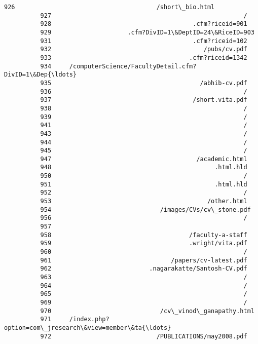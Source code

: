 \documentclass[11pt]{article}
\begin{document}
\begin{Verbatim}[commandchars=\\\{\}]
          926                                       /short\_bio.html
          927                                                     /
          928                                       .cfm?riceid=901
          929                     .cfm?DivID=1\&DeptID=24\&RiceID=903
          931                                       .cfm?riceid=102
          932                                          /pubs/cv.pdf
          933                                      .cfm?riceid=1342
          934     /computerScience/FacultyDetail.cfm?DivID=1\&Dep{\ldots}
          935                                         /abhib-cv.pdf
          936                                                     /
          937                                       /short.vita.pdf
          938                                                     /
          939                                                     /
          941                                                     /
          943                                                     /
          944                                                     /
          945                                                     /
          947                                        /academic.html
          948                                             .html.hld
          950                                                     /
          951                                             .html.hld
          952                                                     /
          953                                           /other.html
          954                              /images/CVs/cv\_stone.pdf
          956                                                     /
          957                                                      
          958                                      /faculty-a-staff
          959                                      .wright/vita.pdf
          960                                                     /
          961                                 /papers/cv-latest.pdf
          962                           .nagarakatte/Santosh-CV.pdf
          963                                                     /
          964                                                     /
          965                                                     /
          969                                                     /
          970                              /cv\_vinod\_ganapathy.html
          971     /index.php?option=com\_jresearch\&view=member\&ta{\ldots}
          972                             /PUBLICATIONS/may2008.pdf

\end{Verbatim}
\end{document}
